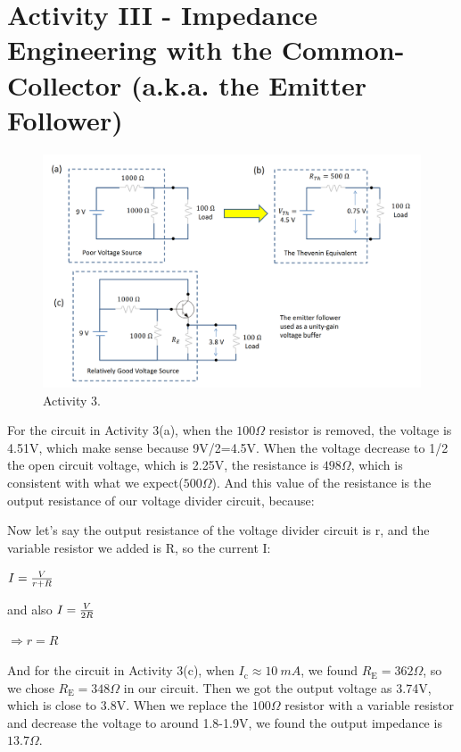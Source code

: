 \documentclass[11pt]{article}
\begin{document}
\section{Activity III - Impedance Engineering with the Common-Collector (a.k.a. the Emitter Follower)}

\begin{figure}[H]
 \begin{center}
  \includegraphics[width=\linewidth/1]{act3figure}
  \caption{Activity 3.}
  \label{fig:act3figure}
 \end{center}
\end{figure}

For the circuit in Activity 3(a), when the $100 \Omega$ resistor is removed, the voltage is 4.51V, which make sense because 9V/2=4.5V. When the voltage decrease to 1/2 the open circuit voltage, which is 2.25V, the resistance is $498 \Omega$, which is consistent with what we expect($500 \Omega$). And this value of the resistance is the output resistance of our voltage divider circuit, because:

Now let's say the output resistance of the voltage divider circuit is r, and the variable resistor we added is R, so the current I:

$I={V \over {r+R}}$

and also $I={V \over {2R}}$

$\Rightarrow r=R$

And for the circuit in Activity 3(c), when $I_{\mathrm{c}} \approx 10 \ mA$, we found $R_{\mathrm{E}} =362 \Omega $, so we chose $R_{\mathrm{E}} =348 \Omega $ in our circuit. Then we got the output voltage as 3.74V, which is close to 3.8V. When we replace the $100 \Omega$ resistor with a variable resistor and decrease the voltage to around 1.8-1.9V, we found the output impedance is $13.7 \Omega$.
\end{document}
